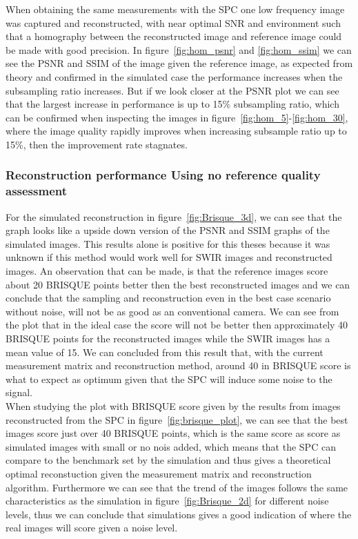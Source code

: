 When obtaining the same measurements with the SPC one low frequency image was captured and reconstructed, with near optimal SNR and environment such that a homography between the reconstructed image and reference image could be made with good precision. In figure~\ref{fig:hom_psnr} and \ref{fig:hom_ssim} we can see the PSNR and SSIM of the image given the reference image, as expected from theory and confirmed in the simulated case the performance increases when the subsampling ratio increases. But if we look closer at the PSNR plot we can see that the largest increase in performance is up to 15\% subsampling ratio, which can be confirmed when inspecting the images in figure~\ref{fig:hom_5}-\ref{fig:hom_30}, where the image quality rapidly improves when increasing subsample ratio up to 15\%, then the improvement rate stagnates.


\subsubsection{Reconstruction performance Using no reference quality assessment}
For the simulated reconstruction in figure~\ref{fig:Brisque_3d}, we can see that the graph looks like a upside down version of the PSNR and SSIM graphs of the simulated images. This results alone is positive for this theses because it was unknown if this method would work well for SWIR images and reconstructed images. An observation that can be made, is that the reference images score about 20 BRISQUE points better then the best reconstructed images and we can conclude that the sampling and reconstruction even in the best case scenario without noise, will not be as good as an conventional camera. We can see from the plot that in the ideal case the score will not be better then approximately 40 BRISQUE points for the reconstructed images while the SWIR images has a mean value of 15. We can concluded from this result that, with the current measurement matrix and reconstruction method, around 40 in BRISQUE score is what to expect as optimum given that the SPC will induce some noise to the signal.\\[0.1in]

When studying the plot with BRISQUE score given by the results from images reconstructed from the SPC in figure~\ref{fig:brisque_plot}, we can see that the best images score just over 40 BRISQUE points, which is the same score as score as simulated images with small or no nois added, which means that the SPC can compare to the benchmark set by the simulation and thus gives a theoretical optimal reconstuction given the measurement matrix and reconstruction algorithm. Furthermore we can see that the trend of the images follows the same characteristics as the simulation in figure~\ref{fig:Brisque_2d} for different noise levels, thus we can conclude that simulations gives a good indication of where the real images will score given a noise level.\\[0.1in]

